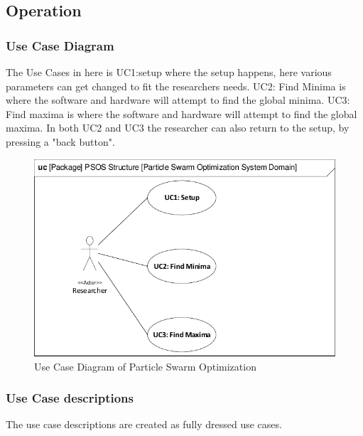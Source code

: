 \subsection{Operation}\label{requirementspecification:operation}


\subsubsection{Use Case Diagram} \label{requirementspecification:usecasediagrams}
The Use Cases in here is UC1:setup where the setup happens, here various parameters can get changed to fit the researchers needs. UC2: Find Minima is where the software and hardware will attempt to find the global minima. UC3: Find maxima is where the software and hardware will attempt to find the global maxima. In both UC2 and UC3 the researcher can also return to the setup, by pressing a "back button".

\begin{figure}[H]
	\centering
	\includegraphics[width=0.8\linewidth]{diagram/uc_particle_swarm_optimization_system.pdf}
	\caption{Use Case Diagram of Particle Swarm Optimization}
	\label{fig:ucdiagram}
\end{figure}


\subsubsection{Use Case descriptions} \label{requirementspecification:usecasedescriptions}
The use case descriptions are created as fully dressed use cases. 





